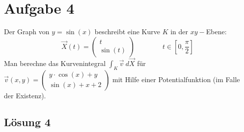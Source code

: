\documentclass[main.tex]{subfiles}
\begin{document}
\section{Aufgabe 4}
Der Graph von $y = \sin(x)$ beschreibt eine Kurve $K$ in der $xy-$Ebene: 
\[
\vec{X}(t)
= \left( \begin{array}{cc}
	t \\ 
	\sin(t)
\end{array} \right)
%
\qquad \qquad
%
t \in \left[ 0,\frac{\pi}{2}\right] 
\]
%
Man berechne das Kurvenintegral $\int_K\vec{v} \ d\vec{X}$ für 
$\vec{v}(x,y)
= \left( \begin{array}{cc}
	y \cdot \cos \left( x \right) + y \\ 
	\sin \left( x \right) +x+2
\end{array} \right)$
mit Hilfe einer Potentialfunktion (im Falle der Existenz).

\subsection{Lösung 4}
\end{document}
